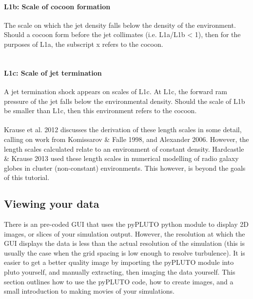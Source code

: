 \documentclass[12pt,a4paper]{report}
\begin{document}
\paragraph{L1b: Scale of cocoon formation}
The scale on which the jet density falls below the density of the environment. Should a cocoon form before the jet collimates (i.e. L1a/L1b < 1), then for the purposes of L1a, the subscript x refers to the cocoon.\\
\\
\paragraph{L1c: Scale of jet termination}
A jet termination shock appears on scales of L1c. At L1c, the forward ram pressure of the jet falls below the environmental density. Should the scale of L1b be smaller than L1c, then this environment refers to the cocoon.\\
\\
Krause et al. 2012 discusses the derivation of these length scales in some detail, calling on work from Komissarov \& Falle 1998, and Alexander 2006. However, the length scales calculated relate to an environment of constant density. Hardcastle \& Krause 2013 used these length scales in numerical modelling of radio galaxy globes in cluster (non-constant) environments. This however, is beyond the goals of this tutorial.

\subsection{Viewing your data}
There is an pre-coded GUI that uses the pyPLUTO python module to display 2D images, or slices of your simulation output. However, the resolution at which the GUI displays the data is less than the actual resolution of the simulation (this is usually the case when the grid spacing is low enough to resolve turbulence). It is easier to get a better quality image by importing the pyPLUTO module into pluto yourself, and manually extracting, then imaging the data yourself. This section outlines how to use the pyPLUTO code, how to create images, and a small introduction to making movies of your simulations.
\end{document}
